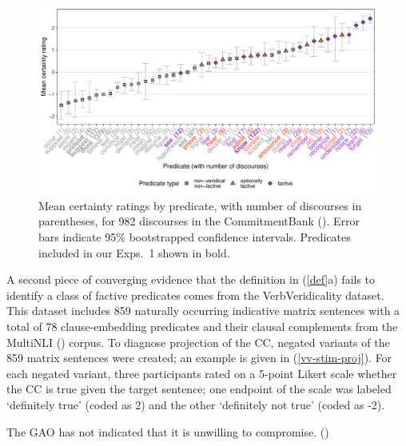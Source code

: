 \documentclass[11pt,fleqn]{article}
\newcommand{\6}{\mbox{$[\hspace*{-.6mm}[$}}
\newcommand{\9}{\mbox{$]\hspace*{-.6mm}]$}}
\begin{document}
\begin{figure}[H]
\centering
\includegraphics[width=.75\paperwidth]{../../CommitmentBank-analysis/graphs/means-projectivity-by-predicate-variability}

\caption{Mean certainty ratings by predicate, with number of discourses in parentheses, for 982 discourses in the CommitmentBank (\citealt*{demarneffe-etal-sub23}). Error bars indicate 95\% bootstrapped confidence intervals. Predicates included in our Exps.~1 shown in bold.}
\label{f-commitmentbank}
\end{figure}

A second piece of converging evidence that the definition in (\ref{def}a) fails to identify a class of factive predicates comes from the VerbVeridicality dataset. This dataset includes 859 naturally occurring indicative matrix sentences with a total of 78 clause-embedding predicates and their clausal complements from the MultiNLI (\citealt{williams-etal2018}) corpus. To diagnose projection of the CC, negated variants of the 859 matrix sentences were created; an example is given in (\ref{vv-stim-proj}). For each negated variant, three participants rated on a 5-point Likert scale whether the CC is true given the target sentence; one endpoint of the scale was labeled `definitely true' (coded as 2) and the other `definitely not true' (coded as -2).

\begin{exe}
\ex\label{vv-stim-proj} The GAO has not indicated that it is unwilling to compromise. \hfill (\citealt[2234]{ross-pavlick2019})
\end{exe}
\end{document}
